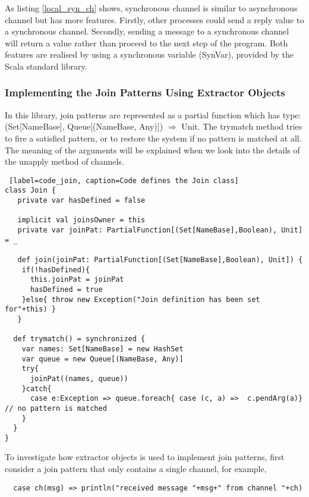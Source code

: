 As listing \ref{local_syn_ch} shows, synchronous channel is similar to asynchronous channel but has more features.   Firstly, other processes could send a reply value to a synchronous channel.  Secondly, sending a message to a synchronous channel will return a value rather than proceed to the next step of the program.  Both features are realised by using a synchronous variable (SynVar), provided by the Scala standard library.

\subsubsection{Implementing the Join Patterns Using Extractor Objects}

In this library, join patterns are represented as a partial function which has type: \\
(Set[NameBase], Queue[(NameBase, Any)]) $\Rightarrow$ Unit.  The trymatch method tries to fire a satisfied pattern, or to restore the system if no pattern is matched at all.  The meaning of the arguments will be explained when we look into the details of the unapply method of channels.

\begin{lstlisting} [label=code_join, caption=Code defines the Join class]
class Join {
   private var hasDefined = false
  
   implicit val joinsOwner = this
   private var joinPat: PartialFunction[(Set[NameBase],Boolean), Unit] = _
   
   def join(joinPat: PartialFunction[(Set[NameBase],Boolean), Unit]) {
    if(!hasDefined){
      this.joinPat = joinPat
      hasDefined = true
    }else{ throw new Exception("Join definition has been set for"+this) }
   }
   
  def trymatch() = synchronized {
    var names: Set[NameBase] = new HashSet
    var queue = new Queue[(NameBase, Any)]
    try{
      joinPat((names, queue))
    }catch{
      case e:Exception => queue.foreach{ case (c, a) =>  c.pendArg(a)} // no pattern is matched
    }
  }
}
\end{lstlisting}


To investigate how extractor objects is used to implement join patterns, first consider a join pattern that only contains a single channel, for example, 

\begin{lstlisting}
  case ch(msg) => println("received message "+msg+" from channel "+ch) 
\end{lstlisting}

